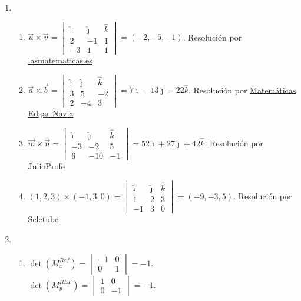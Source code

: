 \documentclass[a4paper]{article}
\newcommand{\exercise}{\item}
\begin{document}
\begin{enumerate}
\begin{enumerate} [label=(\alph*)]
		\item Es SCD si $m\in \mathbb{R}-\{2,-3\}$. Es SCI si $m=2$. Es SI si $m=-3$. Resolución por \href{https://youtu.be/jKLkTVmpmSk}{Cibermatex}.
		\item $\Delta=-\alpha^2-14\alpha-13=0$ cuando $\alpha=-1$ o $\alpha=-13$. Con $\alpha=-1$ y $\alpha=-13$ es SCI (como es homogéneo no puede ser SI) y con $\alpha\in\mathbb{R}-\{-1,-13\}$ es SCD.
\end{enumerate}\exercise\begin{enumerate} [label=(\alph*)]		\item $\vec{u} \times \vec{v}=\begin{vmatrix} \hat{\imath} & \hat{\jmath} & \hat{k} \\ 2 & -1 & 1 \\ -3 & 1 & 1\end{vmatrix}=(-2,-5,-1)$. Resolución por \href{https://youtu.be/P0aD2zSXuC8}{lasmatematicas.es}
		\item $\vec{a} \times \vec{b}=\begin{vmatrix} \hat{\imath} & \hat{\jmath} & \hat{k} \\ 3 & 5 & -2 \\ 2 & -4 & 3\end{vmatrix}=7\hat{\imath}-13\hat{\jmath}-22\hat{k}$. Resolución por \href{https://youtu.be/-JODKVdQ9H4}{Matemáticas Edgar Navia}
		\item $\vec{m} \times \vec{n}=\begin{vmatrix} \hat{\imath} & \hat{\jmath} & \hat{k} \\ -3 & -2 & 5 \\ 6 & -10 & -1\end{vmatrix}=52\hat{\imath}+27\hat{\jmath}+42\hat{k}$. Resolución por \href{https://youtu.be/fmAhi1N-uL8}{JulioProfe}
		\item $(1,2,3) \times (-1,3,0)=\begin{vmatrix} \hat{\imath} & \hat{\jmath} & \hat{k} \\ 1 & 2 & 3 \\ -1 & 3 & 0\end{vmatrix}=(-9,-3,5)$. Resolución por \href{https://youtu.be/_5MyVA6znPQ}{Seletube}
\end{enumerate}\exercise\begin{enumerate} [label=(\alph*)]		\item $\det(M^{Ref}_x)=\begin{vmatrix} -1 & 0 \\ 0 & 1 \end{vmatrix}=-1$. \\ $\det(M^{REF}_y)=\begin{vmatrix} 1 & 0 \\ 0 & -1 \end{vmatrix}=-1$.  

\end{enumerate}
\end{enumerate}
\end{document}
